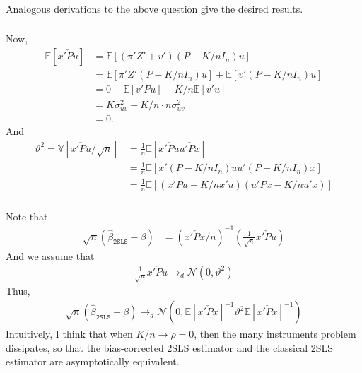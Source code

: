 \documentclass[12pt]{article}
\newcommand{\E}{\mathbb{E}}
\newcommand{\V}{\mathbb{V}}
\newcommand{\mtx}[1]{\ensuremath{\bm{\mathit{#1}}}}
\newcommand{\N}{\mathcal{N}}
\begin{document}
\subsubsection{}
Analogous derivations to the above question give the desired results.

\subsubsection{}
Now,
\begin{align*}
\E[\mtx{x}'\check{\mtx{P}}\mtx{u}] &= \E[(\mtx{\pi}'\mtx{Z}'+\mtx{v}')(\mtx{P} -K/n\mtx{I}_n)\mtx{u}]\\
&= \E[\mtx{\pi}'\mtx{Z}'(\mtx{P} -K/n\mtx{I}_n)\mtx{u}] + \E[\mtx{v}'(\mtx{P} -K/n\mtx{I}_n)\mtx{u}]\\
&=0 + \E[\mtx{v}'\mtx{P}\mtx{u}] - K/n\E[\mtx{v}'\mtx{u}]\\
&= K \sigma^2_{uv} - K/n \cdot n \sigma^2_{uv}\\
&=0.
\end{align*}
And
\begin{align*}
\vartheta^2 = \V[\mtx{x}'\check{\mtx{P}}\mtx{u}/\sqrt{n}] &= \frac{1}{n}\E[\mtx{x}'\check{\mtx{P}}\mtx{u}\mtx{u}'\check{\mtx{P}}\mtx{x}]\\
&=\frac{1}{n}\E[\mtx{x}'(\mtx{P} -K/n\mtx{I}_n)\mtx{u}\mtx{u}'(\mtx{P} -K/n\mtx{I}_n)\mtx{x}]\\
&=\frac{1}{n}\E[(\mtx{x}'\mtx{P}\mtx{u} - K/n\mtx{x}'\mtx{u})(\mtx{u}'\mtx{P}\mtx{x}-K/n\mtx{u}'\mtx{x})]
\end{align*}

\subsubsection{}
Note that
\begin{align*}
\sqrt{n}(\hat\beta_{\texttt{2SLS}} - \beta) &= (\mtx{x}'\check{\mtx{P}}\mtx{x}/n)^{-1}(\frac{1}{\sqrt{n}}\mtx{x}'\check{\mtx{P}}\mtx{u})
\end{align*}
And we assume that
\begin{align*}
\frac{1}{\sqrt{n}}\mtx{x}'\check{\mtx{P}}\mtx{u} \to_d \N(0, \vartheta^2)
\end{align*}
Thus,
\begin{align*}
\sqrt{n}(\hat\beta_{\texttt{2SLS}} - \beta) \to_d \N(0, \E[\mtx{x}'\check{\mtx{P}}\mtx{x}]^{-1}\vartheta^2\E[\mtx{x}'\check{\mtx{P}}\mtx{x}]^{-1})
\end{align*}
Intuitively, I think that when $K/n \to \rho = 0$, then the many instruments problem dissipates, so that the bias-corrected 2SLS estimator and the classical 2SLS estimator are asymptotically equivalent.
\end{document}
